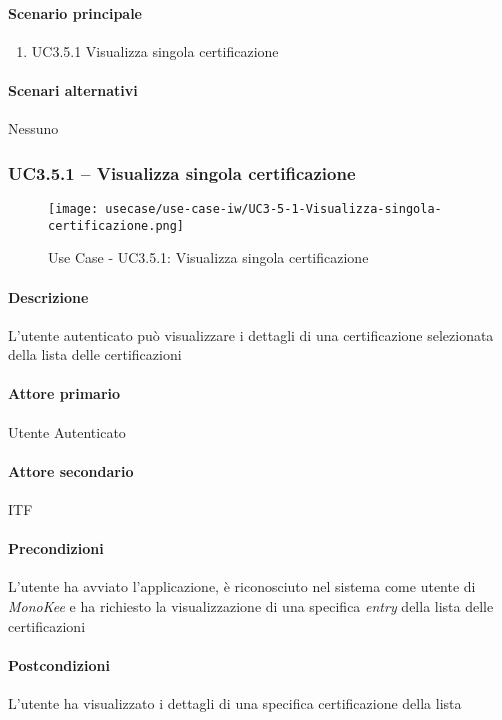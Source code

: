 \paragraph{Scenario principale}  
    \begin{enumerate}
        \item UC3.5.1 Visualizza singola certificazione
    \end{enumerate}
\paragraph{Scenari alternativi}  Nessuno





\subsubsection{UC3.5.1 – Visualizza singola certificazione}
\begin{figure}[!htbp] 
    \centering 
    \texttt{[image: usecase/use-case-iw/UC3-5-1-Visualizza-singola-certificazione.png]} 
    \caption{Use Case - UC3.5.1: Visualizza singola certificazione}
\end{figure}

\paragraph{Descrizione}  L’utente autenticato può visualizzare i dettagli di una certificazione selezionata della lista delle certificazioni
\paragraph{Attore primario}  Utente Autenticato
\paragraph{Attore secondario}  ITF
\paragraph{Precondizioni}  L’utente ha avviato l’applicazione, è riconosciuto nel sistema come utente di \textit{MonoKee} e ha richiesto la visualizzazione di una specifica \textit{entry} della lista delle certificazioni
\paragraph{Postcondizioni}  L’utente ha visualizzato i dettagli di una specifica certificazione della lista

